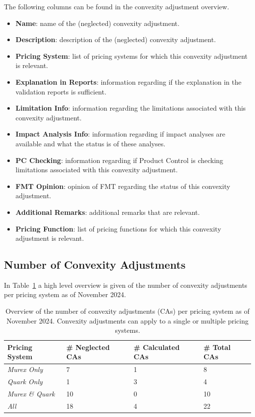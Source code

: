 \documentclass[reviewdoc]{pmv_report} %
\begin{document}
The following columns can be found in the convexity adjustment overview.
\begin{itemize}
  \item \textbf{Name}: name of the (neglected) convexity adjustment.
  \item \textbf{Description}: description of the (neglected) convexity adjustment.
  \item \textbf{Pricing System}: list of pricing systems for which this convexity adjustment is relevant.
  \item \textbf{Explanation in Reports}: information regarding if the explanation in the validation reports is sufficient.
  \item \textbf{Limitation Info}: information regarding the limitations associated with this convexity adjustment.
  \item \textbf{Impact Analysis Info}: information regarding if impact analyses are available and what the status is of these
    analyses.
  \item \textbf{PC Checking}: information regarding if Product Control is checking limitations associated with this convexity adjustment.
  \item \textbf{FMT Opinion}: opinion of FMT regarding the status of this convexity adjustment.
  \item \textbf{Additional Remarks}: additional remarks that are relevant.
  \item \textbf{Pricing Function}: list of pricing functions for which this convexity adjustment is relevant.
\end{itemize}

\subsection{Number of Convexity Adjustments}
\label{sec:numberOfConvexityAdjustments}
In Table~\ref{table:numberOfConvexityAdjustments} a high level overview is given of the number of convexity adjustments per pricing system as of November 2024.

\begin{table}[htb!]
\footnotesize
\centering
\begin{tabular}{l|l|l|l}
  \toprule[0.05cm]
  \textbf{Pricing System} & \textbf{\# Neglected CAs} &{\textbf{\# Calculated CAs}} & {\textbf{\# Total CAs}} \\
  \hline\hline
  \textit{Murex Only}     & 7  & 1 & 8 \\ \hline
  \textit{Quark Only}     & 1  & 3 & 4 \\ \hline
  \textit{Murex \& Quark} & 10 & 0 & 10 \\ \hline \hline
  \textit{All}            & 18 & 4 & 22 \\
  \bottomrule[0.05cm]
\end{tabular}
\caption{Overview of the number of convexity adjustments (CAs) per pricing system as of November 2024.
Convexity adjustments can apply to a single or multiple pricing systems.}
\label{table:numberOfConvexityAdjustments}
\end{table}
\end{document}
